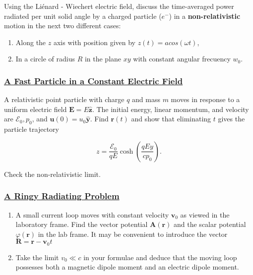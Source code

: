 Using the Liénard - Wiechert electric field, discuss the time-averaged power radiated per unit solid angle by a charged particle ($e^{-}$) in a \textbf{non-relativistic} motion in the next two different cases:

\begin{enumerate}
	\item Along the $z$ axis with position given by $z(t)= a cos (\omega t)$,
	\item In a circle of radius $R$ in the plane $xy$ with constant angular frecuency $w_{0}$.
\end{enumerate} 

\subsubsection{\hyperref[A Fast Particle in a Constant Electric Field]{A Fast Particle in a Constant Electric Field}}

A relativistic point particle with charge $q$ and mass $m$ moves in response to a uniform electric field $\mathbf{E}=E \hat{\mathbf{z}}$. The initial energy, linear momentum, and velocity are $\mathcal{E}_{0}, p_{0}$, and $\mathbf{u}(0)=u_{0} \hat{\mathbf{y}} .$ Find $\mathbf{r}(t)$ and show that eliminating $t$ gives the particle trajectory

\begin{equation}
z=\frac{\mathcal{E}_{0}}{q E} \cosh \left(\frac{q E y}{c p_{0}}\right).
\end{equation}

Check the non-relativistic limit.

\subsubsection{\hyperref[A Ringy Radiating Problem]{A Ringy Radiating Problem}}

\begin{enumerate}
	\item A small current loop moves with constant velocity $\mathbf{v}_{0}$ as viewed in the laboratory frame. Find the vector potential $\mathbf{A}(\mathbf{r})$ and the scalar potential $\varphi(\mathbf{r})$ in the lab frame. It may be convenient to introduce the vector $\mathbf{R}=\mathbf{r}-\mathbf{v}_{0} t$
	\item Take the limit $v_{0} \ll c$ in your formulae and deduce that the moving loop possesses both a magnetic dipole moment and an electric dipole moment.
\end{enumerate}






